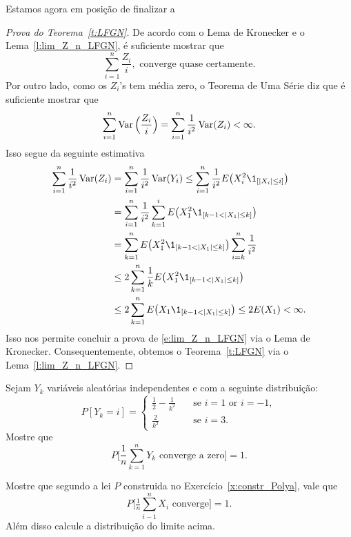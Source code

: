 \begin{topics}
Estamos agora em posição de finalizar a
\begin{proof}[Prova do Teorema~\ref{t:LFGN}]
  De acordo com o Lema de Kronecker e o Lema~\ref{l:lim_Z_n_LFGN}, é suficiente mostrar que
  \begin{equation}
    \sum_{i=1}^n \frac{Z_i}{i}, \text{ converge quase certamente}.
  \end{equation}
  Por outro lado, como os $Z_i$'s tem média zero, o Teorema de Uma Série diz que é suficiente mostrar que
  \begin{equation}
    \sum_{i=1}^n \operatorname{Var}\Big(\frac{Z_i}{i}\Big) = \sum_{i=1}^n \frac{1}{i^2} \operatorname{Var}(Z_i) < \infty.
  \end{equation}
  Isso segue da seguinte estimativa
  \begin{equation}
    \begin{split}
      \sum_{i=1}^n \frac{1}{i^2} \Var(Z_i) & = \sum_{i=1}^n \frac{1}{i^2} \Var(Y_i) \leq \sum_{i=1}^n \frac{1}{i^2} E\big( X_i^2 \1_{[|X_i| \leq i]}\big)\\
      & = \sum_{i=1}^n \frac{1}{i^2} \sum_{k=1}^{i} E\big( X_1^2 \1_{[k-1 < |X_1| \leq k]}\big)\\
      & = \sum_{k=1}^n E\big( X_1^2 \1_{[k-1 < |X_1| \leq k]}\big) \sum_{i=k}^{n} \frac{1}{i^2}\\
      & \leq 2 \sum_{k=1}^n \frac{1}{k} E\big( X_1^2 \1_{[k-1 < |X_1| \leq k]}\big)\\
      & \leq 2 \sum_{k=1}^n E\big( X_1 \1_{[k-1 < |X_1| \leq k]}\big) \leq 2E(X_1) < \infty.
    \end{split}
  \end{equation}
  Isso nos permite concluir a prova de \eqref{e:lim_Z_n_LFGN} via o Lema de Kronecker.
  Consequentemente, obtemos o Teorema~\ref{t:LFGN} via o Lema~\ref{l:lim_Z_n_LFGN}.
\end{proof}

\begin{exercise}
  Sejam $Y_k$ variáveis aleatórias independentes e com a seguinte distribuição:
  \begin{equation}
    P[Y_k = i] =
    \begin{cases}
      \frac 12 - \frac 1{k^2} \quad & \text{se $i = 1$ or $i = -1$},\\
      \frac 2{k^2} & \text{se $i = 3$.}
    \end{cases}
  \end{equation}
  Mostre que
  \begin{equation}
    P\Big[ \frac 1n \sum_{k=1}^n Y_k \text{ converge a zero} \Big] = 1.
  \end{equation}
\end{exercise}

\begin{exercise}
  Mostre que segundo a lei $P$ construida no Exercício~\ref{x:constr_Polya}, vale que
  \begin{equation}
    P\big[ \tfrac 1n \sum_{i-1}^n X_i \text{ converge}] = 1.
  \end{equation}
  Além disso calcule a distribuição do limite acima.
\end{exercise}
\end{topics}

